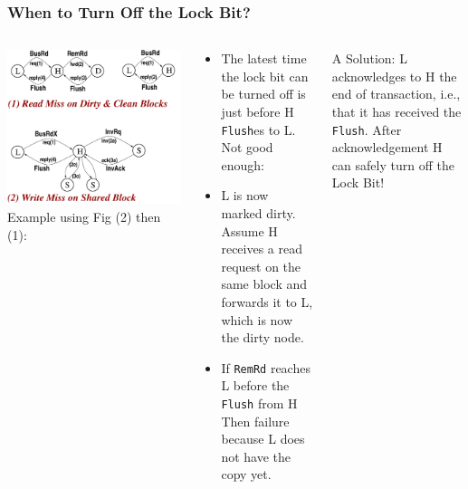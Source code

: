 \documentclass{beamer}
\renewcommand{\emph}[1]{\textcolor{structure}{#1}}
\newcommand{\emp}[1]{\textcolor{DikuRed}{ #1}}
\begin{document}
\begin{frame}[fragile,t]
\frametitle{When to Turn Off the Lock Bit?}

\begin{columns}
\includegraphics[width=45ex]{Figures/FigsInfCoherence/MSIccNUMA}
Example using Fig \emp{(2)} then \emp{(1)}:
\begin{scriptsize}
\begin{itemize}
    \item The latest time the lock bit can be turned off is
            just before H {\tt Flush}es to L. \alert{Not good enough:}\pause
    \item L is now marked dirty. Assume H receives a read request on 
            the same block and forwards it to L, which is now the 
            dirty node.
    \item If {\tt RemRd} reaches L before the {\tt Flush} from H Then \alert{failure}
            because L does not have the copy yet.  
\end  {itemize}
\end{scriptsize}
\bigskip
\emph{A Solution:} L acknowledges to H the end of transaction,
        i.e., that it has received the {\tt Flush}. After
        acknowledgement H can safely turn off the Lock Bit! 
\end{columns}

\end{frame}
\end{document}
